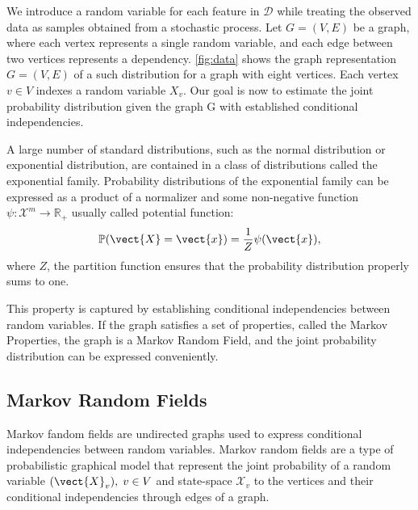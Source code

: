 We introduce a random variable for each feature in $\mathcal{D}$ while treating the observed data as samples obtained from a stochastic process.
Let $G=(V,E)$ be a graph, where each vertex represents a single random variable, and each edge between two vertices represents a dependency. 
 \autoref{fig:data} shows the graph representation $G=(V,E)$ of a such distribution for a graph with eight vertices. 
Each vertex $ v \in V$ indexes a random variable $X_v$.
Our goal is now to estimate the joint probability distribution given the graph G with established conditional independencies.



A large number of standard distributions, such as the normal distribution or exponential distribution, are contained in a class of distributions called the exponential family.
Probability distributions of the exponential family can be expressed as a product of a normalizer and some non-negative function $\psi: \mathcal{X}^m \rightarrow \mathbb{R}_+$ usually called potential function:
\begin{equation}
    \label{eq:probpot}
    \mathbb{P}(\vect{X} = \vect{x}) = \frac{1}{Z} \psi(\vect{x}),
\end{equation}
where $Z$, the partition function ensures that the probability distribution properly sums to one.


This property is captured by establishing conditional independencies between random variables.
If the graph satisfies a set of properties, called the Markov Properties, the graph is a Markov Random Field, and the joint probability distribution can be expressed conveniently.

\subsection{Markov Random Fields}
Markov fandom fields are undirected graphs used to express conditional independencies between random variables. 
Markov random fields are a type of probabilistic graphical model that represent the joint probability of a random variable $(\vect{X}_v), \; v \in V$ and state-space $\mathcal{X}_v$ \wrt to the vertices and their conditional independencies through edges of a graph. 

